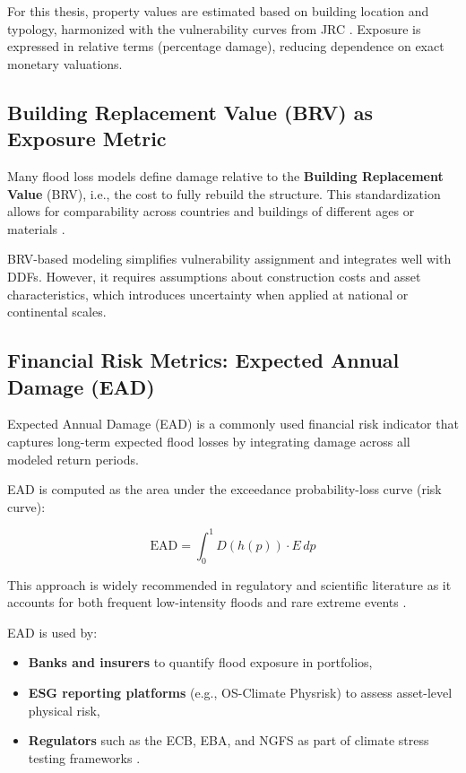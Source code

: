 For this thesis, property values are estimated based on building location and typology, harmonized with the vulnerability curves from JRC \cite{huizinga_global_2017}. Exposure is expressed in relative terms (percentage damage), reducing dependence on exact monetary valuations.

\subsection{Building Replacement Value (BRV) as Exposure Metric}

Many flood loss models define damage relative to the \textbf{Building Replacement Value} (BRV), i.e., the cost to fully rebuild the structure. This standardization allows for comparability across countries and buildings of different ages or materials \cite{huizinga_global_2017, bressan_asset-level_2024}.

BRV-based modeling simplifies vulnerability assignment and integrates well with DDFs. However, it requires assumptions about construction costs and asset characteristics, which introduces uncertainty when applied at national or continental scales.

\subsection{Financial Risk Metrics: Expected Annual Damage (EAD)}

Expected Annual Damage (EAD) is a commonly used financial risk indicator that captures long-term expected flood losses by integrating damage across all modeled return periods.

EAD is computed as the area under the exceedance probability-loss curve (risk curve):

\[
\text{EAD} = \int_0^1 D(h(p)) \cdot E \, dp
\]

This approach is widely recommended in regulatory and scientific literature as it accounts for both frequent low-intensity floods and rare extreme events \cite{ward_how_2011, bavandi_physical_2022}.

EAD is used by:
\begin{itemize}
    \item \textbf{Banks and insurers} to quantify flood exposure in portfolios,
    \item \textbf{ESG reporting platforms} (e.g., OS-Climate Physrisk) to assess asset-level physical risk,
    \item \textbf{Regulators} such as the ECB, EBA, and NGFS as part of climate stress testing frameworks \cite{ecb2020, tcfd2017}.
\end{itemize}

